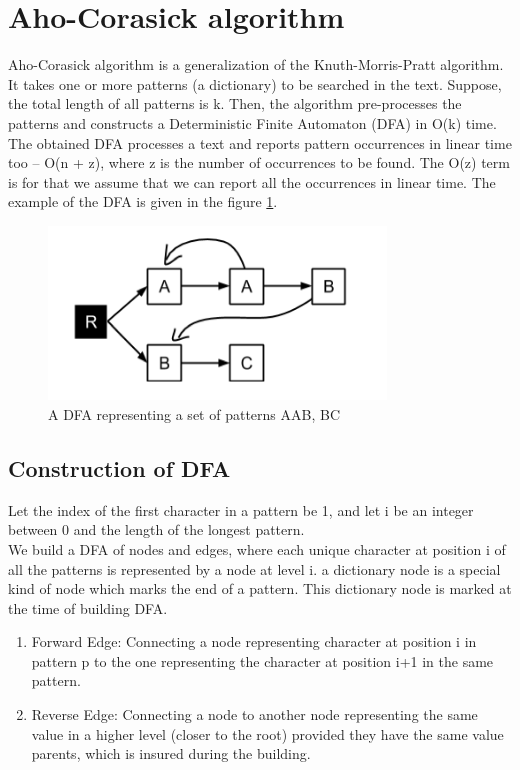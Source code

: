 \documentclass[paper=a4, fontsize=11pt]{scrartcl} %
\numberwithin{equation}{section} %
\numberwithin{figure}{section} %
\numberwithin{table}{section} %
\begin{document}
\newpage

\section{Aho-Corasick algorithm}
Aho-Corasick algorithm \cite{aho} is a generalization of the Knuth-Morris-Pratt algorithm. It takes one or more patterns (a dictionary) to be searched in the text. Suppose, the total length of all patterns is k. Then, the algorithm pre-processes the patterns and constructs a Deterministic Finite Automaton (DFA) \cite{hopcroft} in O(k) time. The obtained DFA processes a text and reports pattern occurrences in linear time too -- O(n + z), where z is the number of occurrences to be found. The O(z) term is for that we assume that we can report all the occurrences in linear time. The example of the DFA is given in the figure \ref{dfa}.

\begin{figure}[h!]
\centering
\includegraphics[width=0.8\textwidth]{figures/Example_DFA.png}
\caption{A DFA representing a set of patterns {AAB, BC}}
\label{dfa}
\end{figure}

\subsection{Construction of DFA}
Let the index of the first character in a pattern be 1, and let i be an integer between 0 and the length of the longest pattern.
\\
We build a DFA of nodes and edges, where each unique character at position i of all the patterns is represented by a node at level i. a dictionary node is a special kind of node which marks the end of a pattern. This dictionary node is marked at the time of building DFA.

\begin{enumerate}
\item Forward Edge: Connecting a node representing character at position i in pattern p to the one representing the character at position i+1 in the same pattern.
\item Reverse Edge: Connecting a node to another node representing the same value in a higher level (closer to the root) provided they have the same value parents, which is insured during the building.
\end{enumerate}
\end{document}
